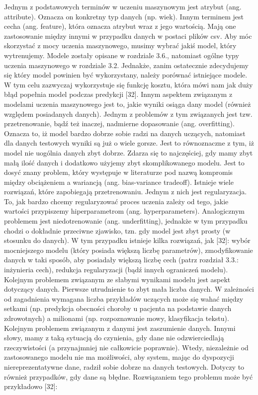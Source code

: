 Jednym z podstawowych terminów w uczeniu maszynowym jest atrybut (ang. attribute). Oznacza on konkretny typ danych (np. wiek). Innym terminem jest cecha (ang. feature), która oznacza atrybut wraz z jego wartością. Mają one zastosowanie między innymi w przypadku danych w postaci plików csv. Aby móc skorzystać z mocy uczenia maszynowego, musimy wybrać jakiś model, który wytrenujemy. Modele zostały opisane w rozdziale 3.6., natomiast ogólne typy uczenia maszynowego w rozdziale 3.2. Jednakże, zanim ostatecznie zdecydujemy się który model powinien być wykorzystany, należy porównać istniejące modele. W tym celu zazwyczaj wykorzystuje się funkcję kosztu, która mówi nam jak duży błąd popełnia model podczas predykcji [32]. 
    Innym aspektem związanym z modelami uczenia maszynowego jest to, jakie wyniki osiąga dany model (również względem posiadanych danych). Jednym z problemów z tym związanych jest tzw. przetrenowanie, bądź też inaczej, nadmierne dopasowanie (ang. overfitting). Oznacza to, iż model bardzo dobrze sobie radzi na danych uczących, natomiast dla danych testowych wyniki są już o wiele gorsze. Jest to równoznaczne z tym, iż model nie uogólnia danych zbyt dobrze. Zdarza się to najczęściej, gdy mamy zbyt małą ilość danych i dodatkowo użyjemy zbyt skomplikowanego modelu. Jest to dosyć znany problem, który występuje w literaturze pod nazwą kompromis między obciążeniem a wariancją (ang. bias-variance tradeoff). Istnieje wiele rozwiązań, które zapobiegają przetrenowaniu. Jednym z nich jest regularyzacja. To, jak bardzo chcemy regularyzować proces uczenia zależy od tego, jakie wartości przypiszemy hiperparametrom (ang. hyperparameters). 
Analogicznym problemem jest niedotrenowanie (ang. underfitting), jednakże w tym przypadku chodzi o dokładnie przeciwne zjawisko, tzn. gdy model jest zbyt prosty (w stosunku do danych). W tym przypadku istnieje kilka rozwiązań, jak [32]:
wybór mocniejszego modelu (który posiada większą liczbę parametrów),
zmodyfikowanie danych w taki sposób, aby posiadały większą liczbę cech (patrz rozdział 3.3.: inżynieria cech),
redukcja regularyzacji (bądź innych ograniczeń modelu).
    Kolejnym problemem związanym ze słabymi wynikami modelu jest aspekt dotyczący danych. Pierwsze utrudnienie to zbyt mała liczba danych. W zależności od zagadnienia wymagana liczba przykładów uczących może się wahać między setkami (np. predykcja obecności choroby u pacjenta na podstawie danych zdrowotnych) a milionami (np. rozpoznawanie mowy, klasyfikacja tekstu). Kolejnym problemem związanym z danymi jest zaszumienie danych. Innymi słowy, mamy z taką sytuacją do czynienia, gdy dane nie odzwierciedlają rzeczywistości (a przynajmniej nie całkowicie poprawnie). Wtedy, niezależnie od zastosowanego modelu nie ma możliwości, aby system, mając do dyspozycji niereprezentatywne dane, radził sobie dobrze na danych testowych. Dotyczy to również przypadków, gdy dane są błędne. Rozwiązaniem tego problemu może być przykładowo [32]:
